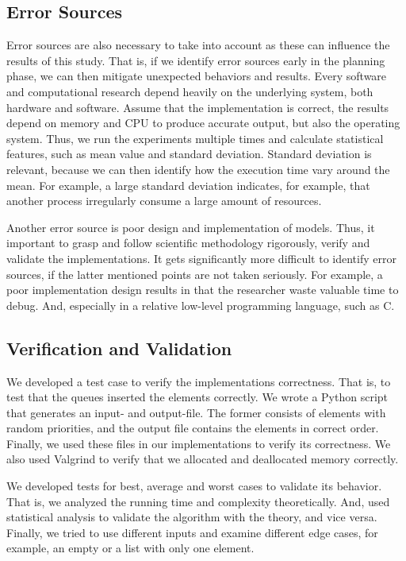 \documentclass[a4paper,11pt]{kth-mag}
\newcommand*{\skippara}{\par\vspace{\baselineskip} \noindent}
\begin{document}
\subsection{Error Sources} Error sources are also necessary to take into account as these can influence the results of this study.
That is, if we identify error sources early in the planning phase, we can then mitigate unexpected behaviors and results.
Every software and computational research depend heavily on the underlying system, both hardware and software.
Assume that the implementation is correct, the results depend on memory and CPU to produce accurate output, but also the operating system.
Thus, we run the experiments multiple times and calculate statistical features, such as mean value and standard deviation.
Standard deviation is relevant, because we can then identify how the execution time vary around the mean.
For example, a large standard deviation indicates, for example, that another process irregularly consume a large amount of resources.

\skippara Another error source is poor design and implementation of models.
Thus, it important to grasp and follow scientific methodology rigorously, verify and validate the implementations.
It gets significantly more difficult to identify error sources, if the latter mentioned points are not taken seriously.
For example, a poor implementation design results in that the researcher waste valuable time to debug.
And, especially in a relative low-level programming language, such as C.

\subsection{Verification and Validation}
We developed a test case to verify the implementations correctness.
That is, to test that the queues inserted the elements correctly.
We wrote a Python script that generates an input- and output-file.
The former consists of elements with random priorities, and the output file contains the elements in correct order.
Finally, we used these files in our implementations to verify its correctness.
We also used Valgrind to verify that we allocated and deallocated memory correctly.

\skippara
We developed tests for best, average and worst cases to validate its behavior.
That is, we analyzed the running time and complexity theoretically.
And, used statistical analysis to validate the algorithm with the theory, and vice versa.
Finally, we tried to use different inputs and examine different edge cases, for example, an empty or a list with only one element.
\end{document}

